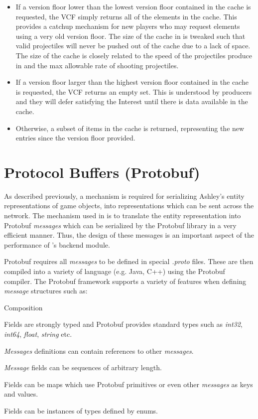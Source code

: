 \begin{itemize}
    \item If a version floor lower than the lowest version floor contained in the cache is requested, the VCF simply returns all of the elements in the cache. This provides a catchup mechanism for new players who may request elements using a very old version floor. The size of the cache in \game{} is tweaked such that valid projectiles will never be pushed out of the cache due to a lack of space. The size of the cache is closely related to the speed of the projectiles produce in \game{} and the max allowable rate of shooting projectiles. 
    \item If a version floor larger than the highest version floor contained in the cache is requested, the VCF returns an empty set. This is understood by producers and they will defer satisfying the Interest until there is data available in the cache.
    \item Otherwise, a subset of items in the cache is returned, representing the new entries since the version floor provided.
\end{itemize}



\section{Protocol Buffers (Protobuf)}\label{sec:impl:proto}
As described previously, a mechanism is required for serializing Ashley's entity representations of game objects, into representations which can be sent across the network. The mechanism used in \game{} is to translate the entity representation into Protobuf \textit{messages} which can be serialized by the Protobuf library in a very efficient manner. Thus, the design of these messages is an important aspect of the performance of \game{}'s backend module. 

Protobuf requires all \textit{messages} to be defined in special \textit{.proto} files. These are then compiled into a variety of language (e.g. Java, C++) using the Protobuf compiler. The Protobuf framework supports a variety of features when defining \textit{message} structures such as:

\begin{labeling}{Composition  }
    \item [Typing] Fields are strongly typed and Protobuf provides standard types such as \textit{int32}, \textit{int64}, \textit{float}, \textit{string} etc.
    \item [Composition] \textit{Messages} definitions can contain references to other \textit{messages}.
    \item [Sequences] \textit{Message} fields can be sequences of arbitrary length.
    \item [Maps] Fields can be maps which use Protobuf primitives or even other \textit{messages} as keys and values.
    \item [Enums] Fields can be instances of types defined by enums.
\end{labeling}

